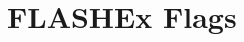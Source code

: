 \hypertarget{group___f_l_a_s_h_ex___flags}{\section{F\-L\-A\-S\-H\-Ex Flags}
\label{group___f_l_a_s_h_ex___flags}
}
